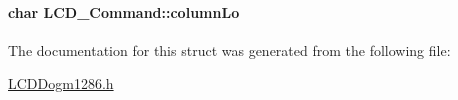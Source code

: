 \paragraph[{column\+Lo}]{\setlength{\rightskip}{0pt plus 5cm}char L\+C\+D\+\_\+\+Command\+::column\+Lo}\label{struct_l_c_d___command_adaf735a3cc75a92e5b8bbc51d7bf2975}


The documentation for this struct was generated from the following file\+:\begin{DoxyCompactItemize}
\item 
\hyperlink{_l_c_d_dogm1286_8h}{L\+C\+D\+Dogm1286.\+h}\end{DoxyCompactItemize}
